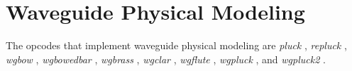 \begin{comment}
\documentclass[10pt]{article}
\usepackage{fullpage, graphicx, url}
\setlength{\parskip}{1ex}
\setlength{\parindent}{0ex}
\title{Waveguide Physical Modeling}



\begin{tabular}{ccc}
The Alternative Csound Reference Manual & & \\
Previous &Signal Generators &Next

\end{tabular}

\end{comment}
\section{Waveguide Physical Modeling}


  The opcodes that implement waveguide physical modeling are \emph{pluck}
, \emph{repluck}
, \emph{wgbow}
, \emph{wgbowedbar}
, \emph{wgbrass}
, \emph{wgclar}
, \emph{wgflute}
, \emph{wgpluck}
, and \emph{wgpluck2}
. 


\begin{comment}
\begin{tabular}{lcr}
Previous &Home &Next \\
Wave Terrain Synthesis &Up &Signal Input and Output

\end{tabular}



\end{comment}

